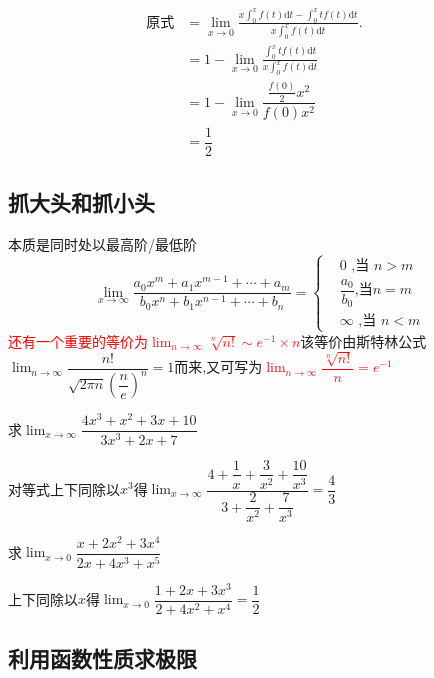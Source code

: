 \documentclass[8pt a4paper, oneside, UTF8]{ctexbook}
\begin{document}
\begin{sloppypar}
\begin{note}
        \begin{align*}
             \text{原式} & = \lim_{x\to0}\frac{x\int_{0}^{x}f(t)\mathrm{d}t-\int_{0}^{x}tf\left(t\right)\mathrm{d}t}{x\!\int_{0}^{x}f(t)\mathrm{d}t}. & \\
             & = 1-\lim_{x\to0}\frac{\int_{0}^{x}tf\left(t\right)\mathrm{d}t}{x\int_{0}^{x}f\left(t\right)\mathrm{d}t} & \\
             & =1-\lim_{x\to0}\dfrac{\frac{f\left(0\right)}{2}x^{2}}{f\left(0\right)x^{2}} & \\
             & =\dfrac{1}{2}
        \end{align*}
    \end{note}
    \subsection{抓大头和抓小头}
    本质是同时处以最高阶/最低阶
    $$
    \lim_{x\to\infty}\dfrac{a_0x^m+a_1x^{m-1}+\cdots+a_m}{b_0x^n+b_1x^{n-1}+\cdots+b_n}=\left.\left\{\begin{aligned}&0\text{ ,当 }n>m\\&\dfrac{a_0}{b_0}\text{,当}n=m\\&\infty\text{ ,当 }n<m\end{aligned}\right.\right.
    $$
    \textcolor{red}{还有一个重要的等价为$\lim_{n\to \infty}\sqrt[n]{n!}\sim e^{-1}\times n$}该等价由斯特林公式$\lim_{n\to\infty}\dfrac{n!}{\sqrt{2\pi n}\left(\dfrac ne\right)^n}=1$而来,又可写为\textcolor{red}{$\lim_{n\rightarrow\infty}\dfrac{\sqrt[n]{n!}}{n}=e^{-1}$}\label{stlgs1}
    \begin{problem}
        求$\lim_{x\to \infty}\dfrac{4x^3+x^2+3x+10}{3x^3+2x+7}$
    \end{problem}
    \begin{solution}
        对等式上下同除以$x^3$得$\lim_{x \to \infty}\dfrac{4+\dfrac1x+\dfrac3{x^2}+\dfrac{10}{x^3}}{3+\dfrac2{x^2}+\dfrac7{x^3}}=\dfrac{4}{3}$
    \end{solution}
    \begin{problem}
        求$\lim_{x\to 0}\dfrac{x+2x^{2}+3x^{4}}{2x+4x^{3}+x^{5}}$
    \end{problem}
    \begin{solution}
        上下同除以$x$得$\lim_{x\to 0}\dfrac{1+2x+3x^{3}}{2+4x^{2}+x^{4}}=\dfrac{1}{2}$
    \end{solution}
    \subsection{利用函数性质求极限}

\end{sloppypar}
\end{document}
